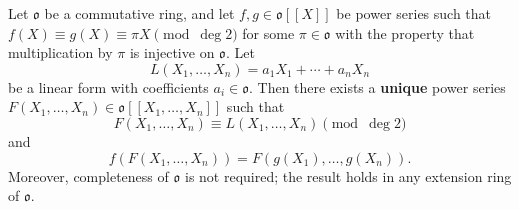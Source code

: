 Let $\mathfrak{o}$ be a commutative ring, and let $f, g \in \mathfrak{o}[[X]]$ be power series such that $f(X) \equiv g(X) \equiv \pi X \pmod{\deg 2}$ for some $\pi \in \mathfrak{o}$ with the property that multiplication by $\pi$ is injective on $\mathfrak{o}$. Let
$$
L(X_1, \dots, X_n) = a_1 X_1 + \cdots + a_n X_n
$$
be a linear form with coefficients $a_i \in \mathfrak{o}$. Then there exists a \textbf{unique} power series $F(X_1, \dots, X_n) \in \mathfrak{o}[[X_1, \dots, X_n]]$ such that
$$
F(X_1, \dots, X_n) \equiv L(X_1, \dots, X_n) \pmod{\deg 2}
$$
and
$$
f(F(X_1, \dots, X_n)) = F(g(X_1), \dots, g(X_n)).
$$
Moreover, completeness of $\mathfrak{o}$ is not required; the result holds in any extension ring of $\mathfrak{o}$.
